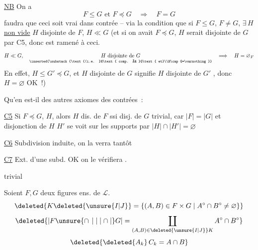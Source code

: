 \uline{NB} On a
\[
 F\leq G\text{ et }F\preceq G\quad\Longrightarrow\quad F=G
\]
 faudra que ceci soit vrai dans  contrée -- via la condition que si $F\leq G$, $F\ne G$, $\exists\,H$  \uline{non vide} $H$ disjointe de $F$, $H\ll G$ (et si on avait $F\preceq G$, $H$ serait disjointe de $G$ par C5, donc  est ramené à ceci. 
\[
 H\ll G,\quad
 \underset{\inserted{\substack{\text{(i.e. }H\text{ comp. à }G\text{ et}\\H\cap G=\varnothing}}}{H\text{ disjointe de }G}
 \quad\Longrightarrow\quad H=\varnothing_{F}
\]
En effet, $H\leq G'\preceq G$,  et $H$ disjointe de $G$ signifie $H$ disjointe de $G'$ , donc $H=\varnothing$ OK~!)


Qu'en est-il des autres axiomes des contrées~:

\uline{C5} Si $F\preceq G$, $H$, alors $H$ dis. de $F$ ssi disj. de $G$ trivial, car $|F|=|G|$ et disjonction de $H$  $H'$ se voit sur les supports par $|H|\cap|H'|=\varnothing$

\uline{C6} Subdivision induite, on la verra tantôt

\uline{C7} Ext. d'une subd. OK on le vérifiera .

\uline{} trivial

 Soient $F,G$ deux figures ens. de $\mathcal L$.   
\[
 \deleted{K\deleted{\unsure{I|J}}=\{(A,B)\in F\times G\mid A^\circ\cap B^\circ\ne\varnothing\}}
\]
\[
 \deleted{|F\unsure{\cap\,\mid|\mid\cap\mid}G|=\coprod_{(A,B)\in \deleted{\unsure{I|J}}K} A^\circ\cap B^\circ}
\]
\[
 \deleted{\deleted{A_k}\,C_k=A\cap B}
\]

